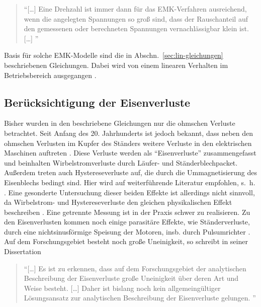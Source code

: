 \documentclass[conference,twocolumn]{IEEEtran}
\begin{document}
\begin{quote}
\enquote{[\ldots] Eine Drehzahl ist immer dann für das EMK-Verfahren ausreichend, wenn die angelegten Spannungen so groß sind, dass der Rauschanteil auf den gemessenen oder berechneten Spannungen vernachlässigbar klein ist. [\ldots] \autocite[S.~48]{Kellner2012}}
\end{quote}

Basis für solche EMK-Modelle sind die in Abschn.~\ref{sec:lin-gleichungen} beschriebenen Gleichungen.
Dabei wird von einem linearen Verhalten im Betriebsbereich ausgegangen \autocite{piippo_adaptation_2009}.

\subsection{Berücksichtigung der Eisenverluste}\label{sec:eisenverluste}

Bisher wurden in den beschriebene Gleichungen nur die ohmschen Verluste betrachtet.
Seit Anfang des 20. Jahrhunderts ist jedoch bekannt, dass neben den ohmschen Verlusten im Kupfer des Ständers weitere Verluste in den elektrischen Maschinen auftreten \autocites{reinert_calculation_2001}{stumberger_evaluation_2003}{kilthau_parameter-measurement_2001}{sturmberger}.
Diese Verluste werden als \enquote{Eisenverluste} zusammengefasst und beinhalten Wirbelstromverluste durch Läufer- und Ständerblechpacket.
Außerdem treten auch Hystereseverluste auf, die durch die Ummagnetisierung des Eisenblechs bedingt sind.
Hier wird auf weiterführende Literatur empfohlen, s.~h. \textcites{reinert_calculation_2001}{stumberger_evaluation_2003}{kilthau_parameter-measurement_2001}{sturmberger}.
Eine gesonderte Untersuchung dieser beiden Effekte ist allerdings nicht sinnvoll, da Wirbelstrom- und Hystereseverluste den gleichen physikalischen Effekt beschreiben \autocite{reinert_calculation_2001}.
Eine getrennte Messung ist in der Praxis schwer zu realisieren.
Zu den Eisenverlusten kommen noch einige parasitäre Effekte, wie Ständerverluste, durch eine nichtsinusförmige Speisung der Motoren, insb. durch Pulsumrichter \autocite{Kellner2012}.
Auf dem Forschungsgebiet besteht noch große Uneinigkeit, so schreibt \textcite{Kellner2012} in seiner Dissertation

\begin{quote}
\enquote{[\ldots] Es ist zu erkennen, dass auf dem Forschungsgebiet der analytischen Beschreibung
der Eisenverluste große Uneinigkeit über deren Art und Weise besteht. [\ldots] Daher ist bislang
noch kein allgemeingültiger Lösungsansatz zur analytischen Beschreibung der
Eisenverluste gelungen. \autocite[S.~65]{Kellner2012}} 
\end{quote}
\end{document}
